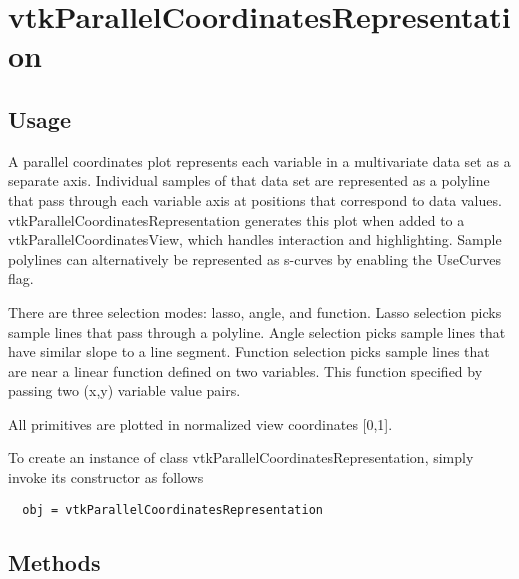 \section{vtkParallelCoordinatesRepresentation}

\subsection{Usage}

  A parallel coordinates plot represents each variable in a multivariate
  data set as a separate axis.  Individual samples of that data set are
  represented as a polyline that pass through each variable axis at 
  positions that correspond to data values.  vtkParallelCoordinatesRepresentation
  generates this plot when added to a vtkParallelCoordinatesView, which handles 
  interaction and highlighting.  Sample polylines can alternatively
  be represented as s-curves by enabling the UseCurves flag.  

  There are three selection modes: lasso, angle, and function. Lasso selection
  picks sample lines that pass through a polyline.  Angle selection picks sample 
  lines that have similar slope to a line segment.  Function selection picks
  sample lines that are near a linear function defined on two variables.  This
  function specified by passing two (x,y) variable value pairs.

  All primitives are plotted in normalized view coordinates [0,1].


To create an instance of class vtkParallelCoordinatesRepresentation, simply
invoke its constructor as follows
\begin{verbatim}
  obj = vtkParallelCoordinatesRepresentation
\end{verbatim}
\subsection{Methods}


